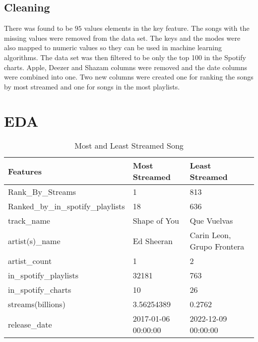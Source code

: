 \documentclass[titlepage]{article}
\begin{document}
\subsection*{Cleaning}
 There was found to be $95$ values elements in the key feature. The songs with the missing values were removed from the data set. The keys and the modes were also mapped to numeric values so they can be used in machine learning algorithms. The data set was then filtered to be only the top 100 in the Spotify charts. Apple, Deezer and Shazam columns were removed and the date columns were combined into one. Two new columns were created one for ranking the songs by most streamed and one for songs in the most playlists.   



\section*{EDA}  
\begin{table}[H]
    \centering
    \caption{Most and Least Streamed Song}
    \begin{tabular}{lll}
    \hline
        Features & Most Streamed & Least Streamed \\ \hline
        Rank\_By\_Streams & 1 & 813 \\ 
        Ranked\_by\_in\_spotify\_playlists & 18 & 636 \\ 
        track\_name & Shape of You & Que Vuelvas \\ 
        artist(s)\_name & Ed Sheeran & Carin Leon, Grupo Frontera \\ 
        artist\_count & 1 & 2 \\ 
        in\_spotify\_playlists & 32181 & 763 \\ 
        in\_spotify\_charts & 10 & 26 \\ 
        streams(billions) & 3.56254389 & 0.2762 \\ 
        release\_date & 2017-01-06 00:00:00 & 2022-12-09 00:00:00 \\ \hline
    \end{tabular}
\end{table}
\end{document}
